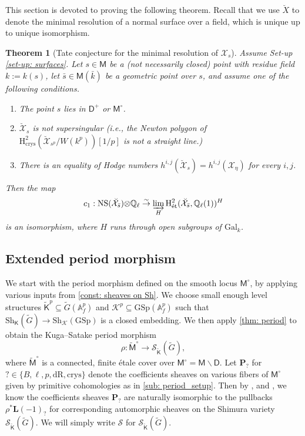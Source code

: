 \documentclass[11pt, letterpaper]{amsart}
\theoremstyle{plain}
\newtheorem{theorem}{Theorem}[section]
\theoremstyle{definition}
\newcommand{\IA}{\mathbb{A}}
\newcommand{\IQ}{\mathbb{Q}}
\newcommand{\sK}{\mathcal{K}}
\newcommand\tensor{{\otimes}}
\newcommand{\<}{\langle}
\renewcommand{\>}{\rangle}
\def\wt{\widetilde}
\newcommand{\Gal}{\mathrm{Gal}}
\newcommand{\NS}{\mathrm{NS}}
\newcommand{\et}{\mathrm{{\acute{e}}t}}
\newcommand{\Sh}{\mathrm{Sh}}
\newcommand{\shS}{\mathscr{S}}
\newcommand{\sfD}{\mathsf{D}}
\newcommand{\sfM}{\mathsf{M}}
\newcommand{\sX}{\mathcal{X}}
\newcommand{\bL}{\mathbf{L}}
\renewcommand{\H}{\mathrm{H}}
\newcommand{\crys}{\mathrm{crys}}
\newcommand{\sfK}{\mathsf{K}}
\newcommand{\bP}{\mathbf{P}}
\newcommand{\dR}{\mathrm{dR}}
\newcommand{\sto}{\stackrel{\sim}{\to}}
\newcommand{\GSp}{\mathrm{GSp}}
\begin{document}
This section is devoted to proving the following theorem. Recall that we use $\breve{X}$ to denote the minimal resolution of a normal surface over a field, which is unique up to unique isomorphism. 
\begin{theorem}[Tate conjecture for the minimal resolution of $\sX_s$]
\label{thm: general theorem}
    Assume Set-up \ref{set-up: surfaces}. 
    Let $s \in \sfM$ be a (not necessarily closed) point with residue field $k := k(s)$, let $\bar{s}\in \sfM(\bar{k})$ be a geometric point over $s$, and assume one of the following conditions.
    \begin{enumerate}[label=\upshape{(\roman*)}]
        \item The point $s$ lies in $\sfD^+$ or $\sfM^\circ$. 
        \item\label{item: non-supersingular} $\breve{\sX}_s$ is not supersingular (i.e., the Newton polygon of $\H^2_\crys(\breve{\sX}_{s^p}/W(k^p))[1/p]$ is not a straight line.) 
        \item\label{item: equality of Hodge numbers} There is an equality of Hodge numbers $h^{i, j}(\breve{\sX}_s) = h^{i, j}(\sX_\eta)$ for every $i, j$. 
    \end{enumerate}
    Then the map 
    $$ c_1 : \NS(\breve{\sX}_{\bar{s}}) \tensor \IQ_\ell \sto \varinjlim_{H} \H^2_\et(\breve{\sX}_{\bar{s}}, \IQ_\ell(1))^{H} $$
    is an isomorphism, where $H$ runs through open subgroups of $\Gal_k$. 
\end{theorem}



\subsection{Extended period morphism}
\label{subset: extended_period_mor} 
We start with the period morphism defined on the smooth locus $\sfM^\circ$, by applying various inputs from \cref{const: sheaves on Sh}. 
We choose small enough level structures $\wt{\sfK}^p \subseteq \wt{G}(\IA^p_f)$ and $\sK^p \subseteq \mathrm{GSp}(\IA^p_f)$ such that $\Sh_{\sfK}(\wt{G}) \to \Sh_{\sK}(\GSp)$ is a closed embedding.
We then apply \cref{thm: period} to obtain the Kuga--Satake period morphism 
\[
\rho : \wt{\sfM}^\circ \to \shS_{\wt{\sfK}}(\wt{G}),
\]
where $\wt{\sfM}^\circ$ is a connected, finite \'etale cover over $\sfM^\circ=\sfM\smallsetminus \sfD$. 
Let $\bP_?$ for $?\in \{B, \ell, p, \dR, \crys\}$ denote the coefficients sheaves on various fibers of $\sfM^\circ$ given by primitive cohomologies as in \cref{sub: period_setup}. 
Then by ,  and , we know the coefficients sheaves $\bP_?$ are naturally isomorphic to the pullbacks $\rho^*\bL(-1)_?$ for corresponding automorphic sheaves on the Shimura variety $\shS_{\wt{\sfK}}(\wt{G})$.
We will simply write $\shS$ for $\shS_{\wt{\sfK}}(\wt{G})$. 
\end{document}
